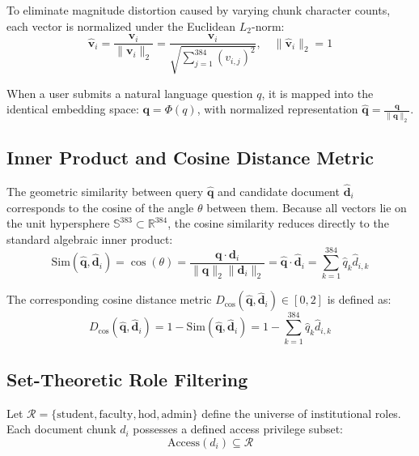\documentclass[conference]{IEEEtran}
\begin{document}
To eliminate magnitude distortion caused by varying chunk character counts, each vector is normalized under the Euclidean $L_2$-norm:
\begin{equation}
\hat{\mathbf{v}}_i = \frac{\mathbf{v}_i}{\|\mathbf{v}_i\|_2} = \frac{\mathbf{v}_i}{\sqrt{\sum_{j=1}^{384} (v_{i,j})^2}}, \quad \|\hat{\mathbf{v}}_i\|_2 = 1
\end{equation}

When a user submits a natural language question $q$, it is mapped into the identical embedding space: $\mathbf{q} = \Phi(q)$, with normalized representation $\hat{\mathbf{q}} = \frac{\mathbf{q}}{\|\mathbf{q}\|_2}$.

\subsection{Inner Product and Cosine Distance Metric}
The geometric similarity between query $\hat{\mathbf{q}}$ and candidate document $\hat{\mathbf{d}}_i$ corresponds to the cosine of the angle $\theta$ between them. Because all vectors lie on the unit hypersphere $\mathbb{S}^{383} \subset \mathbb{R}^{384}$, the cosine similarity reduces directly to the standard algebraic inner product:
\begin{equation}
\text{Sim}(\hat{\mathbf{q}}, \hat{\mathbf{d}}_i) = \cos(\theta) = \frac{\mathbf{q} \cdot \mathbf{d}_i}{\|\mathbf{q}\|_2 \|\mathbf{d}_i\|_2} = \hat{\mathbf{q}} \cdot \hat{\mathbf{d}}_i = \sum_{k=1}^{384} \hat{q}_k \hat{d}_{i,k}
\end{equation}

The corresponding cosine distance metric $D_{\text{cos}}(\hat{\mathbf{q}}, \hat{\mathbf{d}}_i) \in [0, 2]$ is defined as:
\begin{equation}
D_{\text{cos}}(\hat{\mathbf{q}}, \hat{\mathbf{d}}_i) = 1 - \text{Sim}(\hat{\mathbf{q}}, \hat{\mathbf{d}}_i) = 1 - \sum_{k=1}^{384} \hat{q}_k \hat{d}_{i,k}
\end{equation}

\subsection{Set-Theoretic Role Filtering}
Let $\mathcal{R} = \{\text{student}, \text{faculty}, \text{hod}, \text{admin}\}$ define the universe of institutional roles. Each document chunk $d_i$ possesses a defined access privilege subset:
\begin{equation}
\text{Access}(d_i) \subseteq \mathcal{R}
\end{equation}
\end{document}
